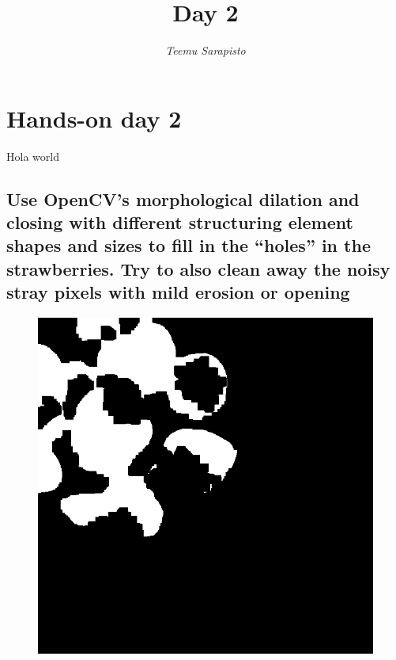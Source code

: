 \documentclass{article}
\begin{document}
\title{Day 2}

\author{\emph{Teemu Sarapisto}}
\maketitle

\newcommand{\aaa}[3]{%
  \fbox{\texttt{[image: \#1]}} \quad
  \fbox{\texttt{[image: \#2]}} \quad
  \fbox{\texttt{[image: \#3]}} \par}
\newcommand{\bbb}[3]{%
  \medskip\noindent\aaa{#1}{#1-#2}{#1-#3}}

\newpage

\setlength{\fboxsep}{0pt}%

\section{Hands-on day 2}
Hola world

\subsection{Use OpenCV’s morphological dilation and closing with different structuring element shapes and sizes to fill in the “holes” in the strawberries. Try to also clean away the noisy stray pixels with mild erosion or opening}
    \begin{figure}[h]
        \centering
        \includegraphics[scale=0.50]{morph}
    \end{figure}
\end{document}
